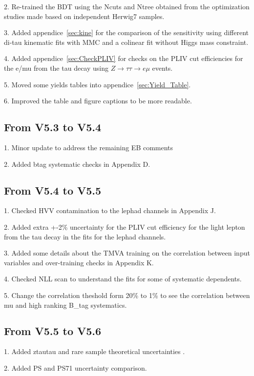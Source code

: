 2. Re-trained the BDT using the Ncuts and Ntree obtained from the optimization studies made based on independent Herwig7 samples.

3. Added appendice~\ref{sec:kine} for the comparison of the sensitivity using different di-tau kinematic fits with MMC and a colinear fit without Higgs mass constraint.

4. Added appendice~\ref{sec:CheckPLIV} for checks on the PLIV cut efficiencies for the e/mu from the tau decay using $Z\rightarrow\tau\tau\rightarrow e\mu$ events.

5. Moved some yields tables into appendice~\ref{sec:Yield_Table}.

6. Improved the table and figure captions to be more readable. 


\subsection{From V5.3 to V5.4}

1. Minor update to address the remaining EB comments

2. Added btag systematic checks in Appendix D. 

\subsection{From V5.4 to V5.5}

1. Checked HVV contamination to the lephad channels in Appendix J.

2. Added extra +-2\% uncertainty for the PLIV cut efficiency for the light lepton from the tau decay in the fits for the lephad channels.

3. Added some details about the TMVA training on the correlation between input variables and over-training checks in Appendix K.

4. Checked NLL scan to understand the fits for some of systematic dependents.

5. Change the correlation theshold form 20\% to 1\% to see the correlation between mu and high ranking B\_tag systematics.

\subsection{From V5.5 to V5.6}

1. Added ztautau and rare sample theoretical uncertainties .

2. Added PS and PS71 uncertainty comparison.


